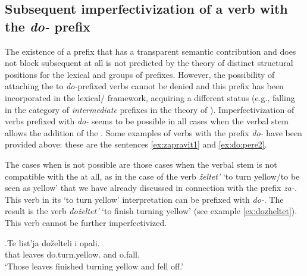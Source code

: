 \subsection{Subsequent imperfectivization of a verb with the \textit{do-} prefix}
The existence of a prefix that has a transparent semantic contribution and does not block subsequent  at all is not predicted by the theory of distinct structural positions for the lexical and  groups of prefixes. However, the possibility of attaching the  to \textit{do-}prefixed verbs cannot be denied and this prefix has been incorporated in the lexical/ framework, acquiring a different status (e.g., falling in the category of \textit{intermediate} prefixes in the theory of \citealt{Tatevosov:07}). Imperfectivization of verbs prefixed with \textit{do-} seems to be possible in all cases when the verbal stem allows the addition of the . Some examples of  verbs with the prefix \textit{do-} have been provided above: these are the sentences \ref{ex:zapravit1} and \ref{ex:do:pere2}.

The cases when  is not possible are those cases when the verbal stem is not compatible with the  at all, as in the case of the verb \textit{\v{z}eltet'} `to turn yellow/to be seen as yellow' that we have already discussed in connection with the prefix \textit{za-}. This verb in its `to turn yellow' interpretation can be prefixed with \textit{do-}. The result is the verb \textit{do\v{z}eltet'} `to finish turning yellow' (see example \ref{ex:dozheltet}). This verb cannot be further imperfectivized. 

\exg.\label{ex:dozheltet}Te list'ja do\v{z}elteli i opali.\\
that leaves do.turn.yellow. and o.fall.\\
\trans `Those leaves finished turning yellow and fell off.'\\

